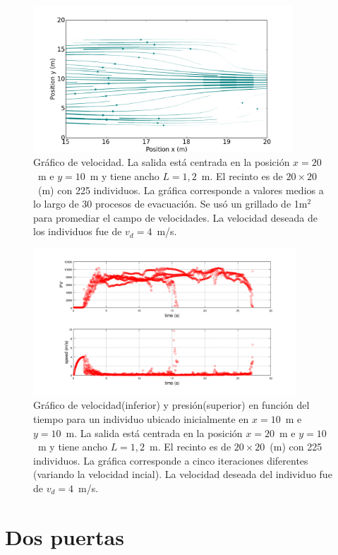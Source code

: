 \begin{figure}[H]
    \centering
    \includegraphics[height=5.5cm]{figuras/flujo_door_1_2m.png}
    \caption[width=5cm]{Gráfico de velocidad. La salida está centrada en la posición $x=20$~m e $y=10$~m y tiene ancho $L=1,2$~m. El recinto es de $20\times 20$~(m) con 225 individuos. La gráfica corresponde a valores medios a lo largo de 30 procesos de evacuación. Se usó un grillado de 1m$^2$ para promediar el campo de velocidades. La velocidad deseada de los individuos fue de $v_d=4$~m/s.}
    \label{sintesis}
\end{figure}

\begin{figure}[H]
    \centering
    \includegraphics[height=5.5cm]{figuras/pv_vel_t_100_1_2.png}
    \caption[width=5cm]{Gráfico de velocidad(inferior) y presión(superior) en función del tiempo para un individuo ubicado inicialmente en $x=10$~m e $y=10$~m.  La salida está centrada en la posición $x=20$~m e $y=10$~m y tiene ancho $L=1,2$~m. El recinto es de $20\times 20$~(m) con 225 individuos. La gráfica corresponde a cinco iteraciones diferentes (variando la velocidad incial). La velocidad deseada del individuo fue de $v_d=4$~m/s.}
    \label{sintesis}
\end{figure}



\section{Dos puertas}

